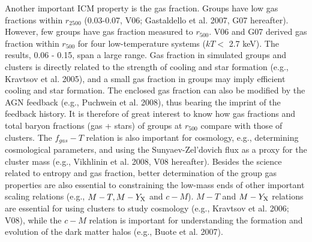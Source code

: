 \documentclass{aastex}
\begin{document}
Another important ICM property is the gas fraction. Groups have low gas
fractions within $r_{2500}$ (0.03-0.07, V06; Gastaldello et al. 2007, G07 hereafter). 
However, few groups have gas fraction measured to $r_{500}$. V06 and G07
derived gas fraction within $r_{500}$ for four low-temperature systems
($kT <$ 2.7 keV). The results, 0.06 - 0.15, span a large range. Gas fraction
in simulated groups and clusters is directly related to the strength of cooling and
star formation (e.g., Kravtsov et al. 2005), and a small gas fraction in groups
may imply efficient cooling and star formation. The enclosed gas fraction can
also be modified by the AGN feedback (e.g., Puchwein et al. 2008), thus
bearing the imprint of the feedback history. It is therefore of great interest to know how
gas fractions and total baryon fractions (gas + stars) of groups at $r_{500}$
compare with those of clusters.
The $f_{gas} - T$ relation is also important for cosmology, e.g., determining
cosmological parameters, and using the Sunyaev-Zel'dovich flux as a proxy for
the cluster mass (e.g., Vikhlinin et al. 2008, V08 hereafter).
Besides the science related to entropy and gas fraction, better determination of
the group gas properties are also essential to constraining the low-mass ends of
other important scaling relations (e.g., $M - T, M - Y_{\rm X}$ and $c - M$).
$M - T$ and $M - Y_{\rm X}$ relations are essential for using clusters to study
cosmology (e.g., Kravtsov et al. 2006; V08),
while the $c - M$ relation is important for understanding the formation and evolution
of the dark matter halos (e.g., Buote et al. 2007).
\end{document}

